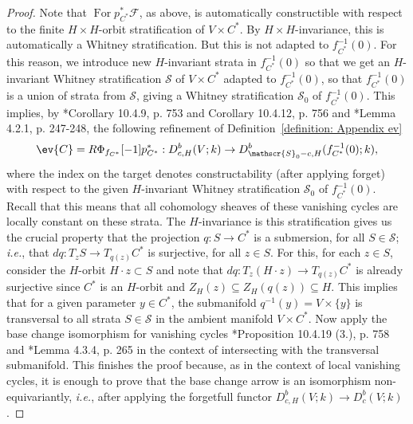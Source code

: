 \documentclass[11pt,letterpaper]{amsart}
\numberwithin{equation}{section}
\begin{document}
\begin{proof}
Note that $\operatorname{For} p_{C^*}^*\mathcal{F}$, as above, is automatically constructible with respect to the finite $H\times H$-orbit stratification of $V\times C^*$.
By $H\times H$-invariance, this is automatically a Whitney stratification.
But this is not adapted to $f_{C^*}^{-1}(0)$.
For this reason, we introduce new $H$-invariant strata in $f_{C^*}^{-1}(0)$ so that we get an $H$-invariant Whitney stratification $\mathscr{S}$ of $V\times C^*$ adapted to $f_{C^*}^{-1}(0)$, so that $f_{C^*}^{-1}(0)$ is a union of strata from $\mathscr{S}$, giving a Whitney stratification $\mathscr{S}_0$ of $f_{C^*}^{-1}(0)$. 
This implies, by \cite{MS22}*{Corollary 10.4.9, p. 753 and Corollary 10.4.12, p. 756} and \cite{Sch03}*{Lemma 4.2.1, p. 247-248}, the following refinement of Definition~\ref{definition: Appendix ev}
\begin{equation}\label{equation: A S-c}
\ev{C} = R\Phi_{f_{C^*}}[-1]p_{C^*}^* :  D^b_{c,H}(V;k) \to D^b_{\mathscr{S}_0-c,H}(f_{C^*}^{-1}(0);k),
\end{equation}
where the index on the target denotes constructability (after applying forget) with respect to the given $H$-invariant Whitney stratification $\mathscr{S}_0$ of $f_{C^*}^{-1}(0)$. 
Recall that this means that all cohomology sheaves of these vanishing cycles are locally constant on these strata.
The $H$-invariance is this stratification gives us the crucial property that the projection $q: S \to C^*$ is a submersion, for all $S\in \mathscr{S}$; {\it i.e.}, that $dq: T_z S \to T_{q(z)} C^*$ is surjective, for all $z\in S$.
For this, for each $z\in S$, consider the $H$-orbit $H\cdot z\subset S$ and note that $dq: T_{z}(H\cdot z) \to T_{q(z)} C^*$ is already surjective since $C^*$ is an $H$-orbit and $Z_{H}(z) \subseteq Z_{H}(q(z)) \subseteq H$.
This implies that for a given parameter $y\in C^*$, the  submanifold $q^{-1}(y) = V\times \{ y\}$ is transversal to all strata $S\in \mathscr{S}$ in the ambient manifold $V\times C^*$.
Now apply the  base change isomorphism for vanishing cycles 
\cite{MS22}*{Proposition 10.4.19 (3.), p. 758} and \cite{Sch03}*{Lemma 4.3.4, p. 265} in the context of intersecting with the transversal submanifold.
This finishes the proof because, as in the context of local vanishing cycles, it is enough to prove that the base change arrow is an isomorphism non-equivariantly, {\it i.e.}, after applying the forgetfull functor $D^b_{c,H}(V;k) \to D^b_{c}(V;k)$. 
\end{proof}
\end{document}
